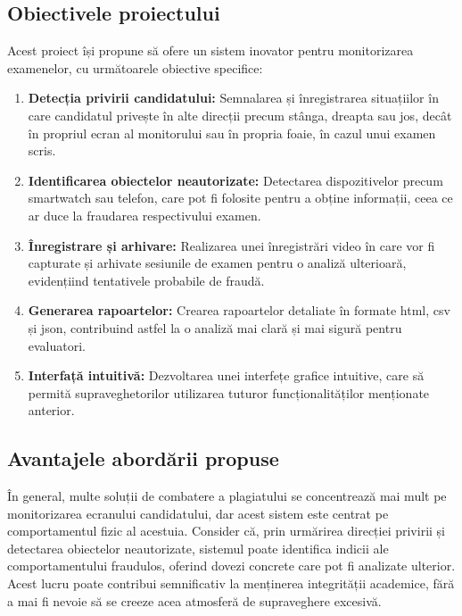 \documentclass[12pt,a4paper]{article}
\begin{document}
\subsection{Obiectivele proiectului}

Acest proiect își propune să ofere un sistem inovator pentru monitorizarea examenelor, cu următoarele obiective specifice:

\begin{enumerate}[label=\arabic*.]
    \item \textbf{Detecția privirii candidatului:} Semnalarea și înregistrarea situațiilor
    în care candidatul privește în alte direcții precum stânga, dreapta sau jos, 
    decât în propriul ecran al monitorului sau în propria foaie, în cazul unui examen scris.
    
    \item \textbf{Identificarea obiectelor neautorizate:} Detectarea dispozitivelor precum
    smartwatch sau telefon, care pot fi folosite pentru a obține informații, 
    ceea ce ar duce la fraudarea respectivului examen.
    
    \item \textbf{Înregistrare și arhivare:} Realizarea unei înregistrări video în care 
    vor fi capturate și arhivate sesiunile de examen pentru o analiză ulterioară, 
    evidențiind tentativele probabile de fraudă.
    
    \item \textbf{Generarea rapoartelor:} Crearea rapoartelor detaliate în formate html, csv și json,
    contribuind astfel la o analiză mai clară și mai sigură pentru evaluatori.
    
    \item \textbf{Interfață intuitivă:} Dezvoltarea unei interfețe grafice intuitive, care să permită
    supraveghetorilor utilizarea tuturor funcționalităților menționate anterior.
\end{enumerate}

\subsection{Avantajele abordării propuse}

În general, multe soluții de combatere a plagiatului se concentrează mai mult 
pe monitorizarea ecranului candidatului, dar acest sistem este centrat pe 
comportamentul fizic al acestuia. Consider că, prin urmărirea direcției privirii 
și detectarea obiectelor neautorizate, sistemul poate identifica indicii ale
comportamentului fraudulos, oferind dovezi concrete care pot fi analizate ulterior. 
Acest lucru poate contribui semnificativ la menținerea integrității academice, 
fără a mai fi nevoie să se creeze acea atmosferă de supraveghere excesivă.
\end{document}
